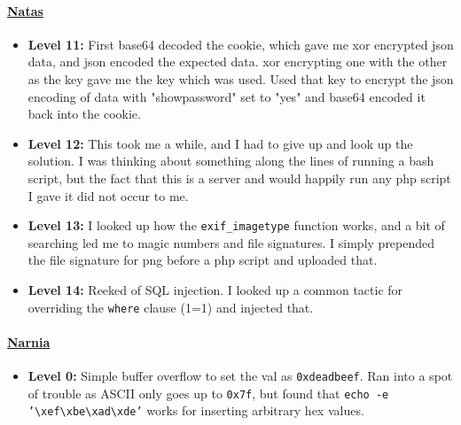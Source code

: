 \documentclass{article}
\def\code#1{\texttt{#1}}
\begin{document}
\begin{itemize}
        \paragraph{\href{http://overthewire.org/wargames/natas}{Natas}}
        \begin{itemize}
            \item \textbf{Level 11: }First base64 decoded the cookie, which gave
                me xor encrypted json data, and json encoded the expected data.
                xor encrypting one with the other as the key gave me the key
                which was used. Used that key to encrypt the json encoding of
                data with "showpassword" set to "yes" and base64 encoded it back
                into the cookie.
            \item \textbf{Level 12: }This took me a while, and I had to give up
                and look up the solution. I was thinking about something along
                the lines of running a bash script, but the fact that this is a
                server and would happily run any php script I gave it did not
                occur to me.
            \item \textbf{Level 13: }I looked up how the \code{exif\_imagetype}
                function works, and a bit of searching led me to magic numbers
                and file signatures. I simply prepended the file signature for
                png before a php script and uploaded that.
            \item \textbf{Level 14: }Reeked of SQL injection. I looked up a
                common tactic for overriding the \code{where} clause (1=1) and injected
                that.
        \end{itemize}
        \paragraph{\href{http://overthewire.org/wargames/narnia}{Narnia}}
        \begin{itemize}
            \item \textbf{Level 0: }Simple buffer overflow to set the val as
                \code{0xdeadbeef}. Ran into a spot of trouble as ASCII only goes up to
                \code{0x7f}, but found that \code{echo -e '\textbackslash xef\textbackslash xbe\textbackslash xad\textbackslash xde'} works for
                inserting arbitrary hex values.
        \end{itemize}

\end{itemize}
\end{document}
